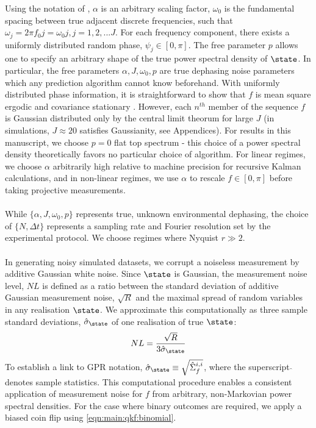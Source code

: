 Using the notation of \cite{soare2014}, $\alpha$ is an arbitrary scaling factor, $\omega_0$ is the fundamental spacing between true adjacent discrete frequencies, such that $\omega_j = 2 \pi f_0 j =\omega_0 j, j = 1, 2, ...J$. For each frequency component, there exists a uniformly distributed random phase, $\psi_j \in [0, \pi]$. The free parameter $p$ allows one to specify an arbitrary shape of the true power spectral density of $\state$. In particular, the free parameters $\alpha, J, \omega_0, p$ are true dephasing noise parameters which any prediction algorithm cannot know beforehand. With uniformly distributed phase information, it is straightforward to show that $f$ is mean square ergodic and covariance stationary \cite{gelb1974applied}. However, each $n^{th}$ member of the sequence $f$ is Gaussian distributed only by the central limit theorum for large $J$ (in simulations, $J \approx 20$ satisfies Gaussianity, see Appendices). For results in this manuscript, we choose $p=0$ flat top spectrum - this choice of a power spectral density theoretically favors no particular choice of algorithm. For linear regimes, we choose $\alpha$ arbitrarily high relative to machine precision for recursive Kalman calculations, and in non-linear regimes, we use $\alpha$ to rescale $f \in [0, \pi]$ before taking projective measurements. 
\\
\\
While $\{ \alpha, J, \omega_0, p \}$ represents true, unknown environmental dephasing, the choice of $\{N, \Delta t\} $ represents a sampling rate and Fourier resolution set by the experimental protocol. We choose regimes where Nyquist $r \gg 2$.
\\
\\
In generating noisy simulated datasets, we corrupt a noiseless measurement by additive Gaussian white noise. Since $\state$ is Gaussian, the measurement noise level, $NL$ is defined as a ratio between the standard deviation of additive Gaussian measurement noise, $\sqrt{R}$ and the maximal spread of random variables in any realisation $\state$. We approximate this computationally as three sample standard deviations, $\hat{\sigma}_\state$ of one realisation of true $\state$:
\begin{align}
NL = \frac{\sqrt{R}}{3\hat{\sigma}_\state}
\end{align}
To establish a link to GPR notation, $\hat{\sigma}_\state \equiv \sqrt{\hat{\Sigma}_f^{i,i}}$, where the superscript $\hat{}$ denotes sample statistics. This computational procedure enables a consistent application of measurement noise for $f$ from arbitrary, non-Markovian power spectral densities. For the case where binary outcomes are required, we apply a biased coin flip using \cref{eqn:main:qkf:binomial}.

